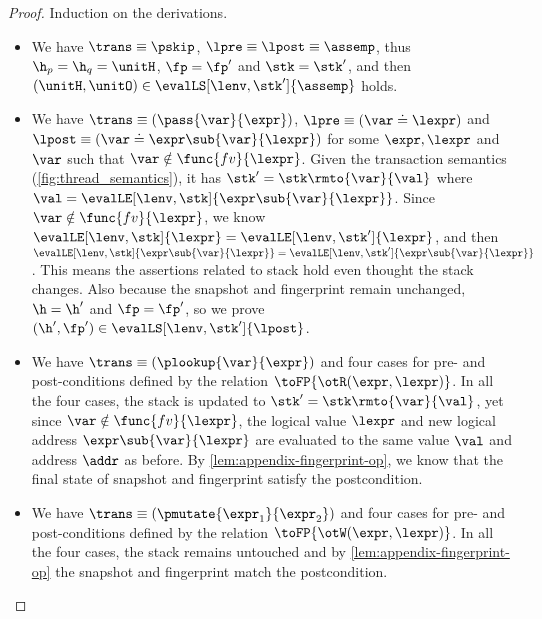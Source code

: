 \begin{proof}
Induction on the derivations.

\begin{itemize}

\item {}
We have \(\trans \equiv \pskip\), \( \lpre \equiv \lpost \equiv \assemp \), thus \( \h_{p} = \h_{q} = \unitH \), \( \fp = \fp' \) and \( \stk = \stk' \), and then \( (\unitH,\unitO ) \in \evalLS[\lenv, \stk']{\assemp} \) holds.

\item {}
We have \(\trans \equiv ( \pass{\var}{\expr} ) \), \( \lpre \equiv ( \var \doteq \lexpr ) \) and \( \lpost \equiv ( \var \doteq \expr\sub{\var}{\lexpr} ) \) 
for some \( \expr, \lexpr \) and \( \var \) such that \( \var \notin \func{fv}{\lexpr}\).
Given the transaction semantics (\cref{fig:thread_semantics}), it has \( \stk' = \stk\rmto{\var}{\val} \) where \( \val = \evalLE[\lenv, \stk]{\expr\sub{\var}{\lexpr}} \).
Since \( \var \notin \func{fv}{\lexpr} \), we know \( \evalLE[\lenv, \stk]{\lexpr} = \evalLE[\lenv, \stk']{\lexpr} \), and then \( \evalLE[\lenv, \stk]{\expr\sub{\var}{\lexpr}} = \evalLE[\lenv, \stk']{\expr\sub{\var}{\lexpr}} \).
This means the assertions related to stack hold even thought the stack changes.
Also because the snapshot and fingerprint remain unchanged, \ie \( \h = \h' \) and \( \fp = \fp' \), so we prove \( (\h', \fp' ) \in \evalLS[\lenv, \stk']{\lpost} \).

\item {}
We have \(\trans \equiv ( \plookup{\var}{\expr} ) \) and four cases for pre- and post-conditions defined by the relation \( \toFP{\otR(\expr, \lexpr)}\).
In all the four cases, the stack is updated to \( \stk' = \stk\rmto{\var}{\val} \), yet since \( \var \notin \func{fv}{\lexpr}\), the logical value \( \lexpr \) and new logical address \( \expr\sub{\var}{\lexpr}\) are evaluated to the same value \( \val \) and address \( \addr \) as before.
By \cref{lem:appendix-fingerprint-op}, we know that the final state of snapshot and fingerprint satisfy the postcondition.

\item {}
We have  \( \trans \equiv (\pmutate{\expr_{1}}{\expr_{2}}) \) and four cases for pre- and post-conditions defined by the relation \( \toFP{\otW(\expr, \lexpr)}\). 
In all the four cases, the stack remains untouched and  by \cref{lem:appendix-fingerprint-op} the snapshot and fingerprint match the postcondition.


\end{itemize}
\end{proof}
